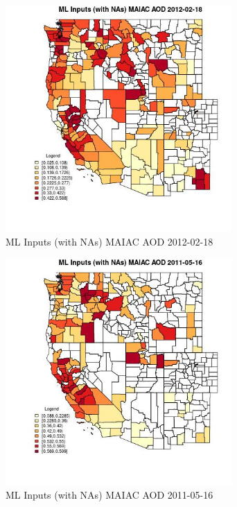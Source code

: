 \begin{figure} 
\centering  
\includegraphics[width=0.77\textwidth]{Code_Outputs/Report_ML_input_PM25_Step4_part_f_de_duplicated_aveswNAs_CountyMAIAC_AODMean2012-02-18.jpg} 
\caption{\label{fig:Report_ML_input_PM25_Step4_part_f_de_duplicated_aveswNAsCountyMAIAC_AODMean2012-02-18}ML Inputs (with NAs) MAIAC AOD 2012-02-18} 
\end{figure} 
 

\begin{figure} 
\centering  
\includegraphics[width=0.77\textwidth]{Code_Outputs/Report_ML_input_PM25_Step4_part_f_de_duplicated_aveswNAs_CountyMAIAC_AODMean2011-05-16.jpg} 
\caption{\label{fig:Report_ML_input_PM25_Step4_part_f_de_duplicated_aveswNAsCountyMAIAC_AODMean2011-05-16}ML Inputs (with NAs) MAIAC AOD 2011-05-16} 
\end{figure} 
 

